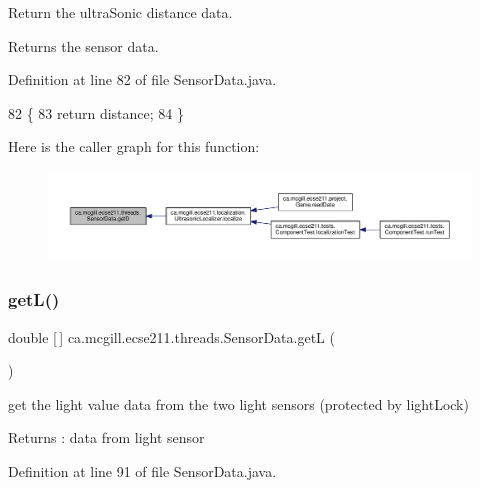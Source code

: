 Return the ultra\+Sonic distance data.

\begin{DoxyReturn}{Returns}
the sensor data. 
\end{DoxyReturn}


Definition at line 82 of file Sensor\+Data.\+java.


\begin{DoxyCode}
82                        \{
83     \textcolor{keywordflow}{return} distance;
84   \}
\end{DoxyCode}
Here is the caller graph for this function\+:\nopagebreak
\begin{figure}[H]
\begin{center}
\leavevmode
\includegraphics[width=350pt]{classca_1_1mcgill_1_1ecse211_1_1threads_1_1_sensor_data_a46cc30522719018a80f89624e0ce458f_icgraph}
\end{center}
\end{figure}
\mbox{\label{classca_1_1mcgill_1_1ecse211_1_1threads_1_1_sensor_data_a39eec50582f0e4bcff8a4669c48e1609}} 
\subsubsection{\texorpdfstring{get\+L()}{getL()}}
{\footnotesize\ttfamily double \mbox{[}$\,$\mbox{]} ca.\+mcgill.\+ecse211.\+threads.\+Sensor\+Data.\+getL (\begin{DoxyParamCaption}{ }\end{DoxyParamCaption})}

get the light value data from the two light sensors (protected by light\+Lock)

\begin{DoxyReturn}{Returns}
\+: data from light sensor 
\end{DoxyReturn}


Definition at line 91 of file Sensor\+Data.\+java.


